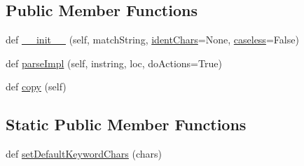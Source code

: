 \subsection*{Public Member Functions}
\begin{DoxyCompactItemize}
\item 
def \hyperlink{classpip_1_1__vendor_1_1pyparsing_1_1Keyword_a18af9d61b88fc4b722ac200c4f8fbdbb}{\+\_\+\+\_\+init\+\_\+\+\_\+} (self, match\+String, \hyperlink{classpip_1_1__vendor_1_1pyparsing_1_1Keyword_a0bad8119f3340e048db399889ffbb756}{ident\+Chars}=None, \hyperlink{classpip_1_1__vendor_1_1pyparsing_1_1Keyword_a96a1817a380907e51abbd45895987a16}{caseless}=False)
\item 
def \hyperlink{classpip_1_1__vendor_1_1pyparsing_1_1Keyword_adce5264f003d6b8a12bfac8001f4f119}{parse\+Impl} (self, instring, loc, do\+Actions=True)
\item 
def \hyperlink{classpip_1_1__vendor_1_1pyparsing_1_1Keyword_afff45f4f834d3fd2e30847f31978fe81}{copy} (self)
\end{DoxyCompactItemize}
\subsection*{Static Public Member Functions}
\begin{DoxyCompactItemize}
\item 
def \hyperlink{classpip_1_1__vendor_1_1pyparsing_1_1Keyword_a3d5d5e44d21399b12bccef764601e9c4}{set\+Default\+Keyword\+Chars} (chars)
\end{DoxyCompactItemize}
